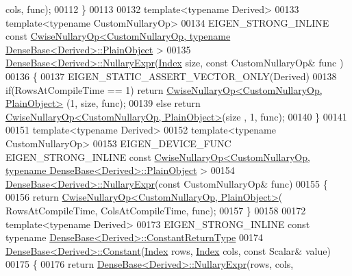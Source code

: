 \begin{DoxyCode}
      cols, func);
00112 \}
00113 
00132 \textcolor{keyword}{template}<\textcolor{keyword}{typename} Derived>
00133 \textcolor{keyword}{template}<\textcolor{keyword}{typename} CustomNullaryOp>
00134 EIGEN\_STRONG\_INLINE \textcolor{keyword}{const} 
      \hyperlink{group___core___module_class_eigen_1_1_cwise_nullary_op}{CwiseNullaryOp<CustomNullaryOp, typename DenseBase<Derived>::PlainObject}
      >
00135 \hyperlink{group___core___module_class_eigen_1_1_dense_base}{DenseBase<Derived>::NullaryExpr}(\hyperlink{namespace_eigen_a62e77e0933482dafde8fe197d9a2cfde}{Index} size, \textcolor{keyword}{const} CustomNullaryOp& func
      )
00136 \{
00137   EIGEN\_STATIC\_ASSERT\_VECTOR\_ONLY(Derived)
00138   \textcolor{keywordflow}{if}(RowsAtCompileTime == 1) \textcolor{keywordflow}{return} \hyperlink{group___core___module_class_eigen_1_1_cwise_nullary_op}{CwiseNullaryOp<CustomNullaryOp, PlainObject>}
      (1, size, func);
00139   \textcolor{keywordflow}{else} \textcolor{keywordflow}{return} \hyperlink{group___core___module_class_eigen_1_1_cwise_nullary_op}{CwiseNullaryOp<CustomNullaryOp, PlainObject>}(size
      , 1, func);
00140 \}
00141 
00151 \textcolor{keyword}{template}<\textcolor{keyword}{typename} Derived>
00152 \textcolor{keyword}{template}<\textcolor{keyword}{typename} CustomNullaryOp>
00153 EIGEN\_DEVICE\_FUNC EIGEN\_STRONG\_INLINE \textcolor{keyword}{const} 
      \hyperlink{group___core___module_class_eigen_1_1_cwise_nullary_op}{CwiseNullaryOp<CustomNullaryOp, typename DenseBase<Derived>::PlainObject}
      >
00154 \hyperlink{group___core___module_class_eigen_1_1_dense_base}{DenseBase<Derived>::NullaryExpr}(\textcolor{keyword}{const} CustomNullaryOp& func)
00155 \{
00156   \textcolor{keywordflow}{return} \hyperlink{group___core___module_class_eigen_1_1_cwise_nullary_op}{CwiseNullaryOp<CustomNullaryOp, PlainObject>}(
      RowsAtCompileTime, ColsAtCompileTime, func);
00157 \}
00158 
00172 \textcolor{keyword}{template}<\textcolor{keyword}{typename} Derived>
00173 EIGEN\_STRONG\_INLINE \textcolor{keyword}{const} \textcolor{keyword}{typename} \hyperlink{group___core___module_class_eigen_1_1_cwise_nullary_op}{DenseBase<Derived>::ConstantReturnType}
00174 \hyperlink{group___core___module_ab0ae1bfa72faedcaf53af81ca76c446b}{DenseBase<Derived>::Constant}(\hyperlink{namespace_eigen_a62e77e0933482dafde8fe197d9a2cfde}{Index} rows, \hyperlink{namespace_eigen_a62e77e0933482dafde8fe197d9a2cfde}{Index} cols, \textcolor{keyword}{const} Scalar& 
      value)
00175 \{
00176   \textcolor{keywordflow}{return} \hyperlink{group___core___module_class_eigen_1_1_dense_base}{DenseBase<Derived>::NullaryExpr}(rows, cols, 

\end{DoxyCode}
